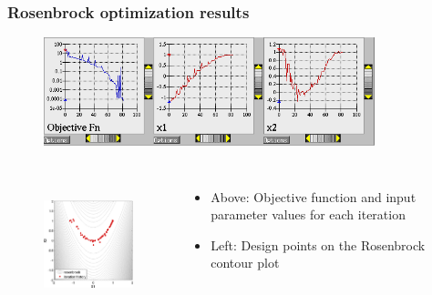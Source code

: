 \documentclass[t]{beamer}
\begin{document}

\begin{frame}
  \frametitle{Rosenbrock optimization results}
  \begin{figure}
    \includegraphics[width=96mm]{images/rosenbrock_values.png}
  \end{figure}
  \vskip -5mm
  \begin{columns}
    \begin{figure}
      \includegraphics[height=40mm]{images/rosenbrock_contour_points.png}
    \end{figure}
    \begin{itemize}
      \item Above: Objective function and input parameter values for each
            iteration
      \item Left: Design points on the Rosenbrock contour plot
    \end{itemize}
  \end{columns}
\end{frame}

\end{document}
